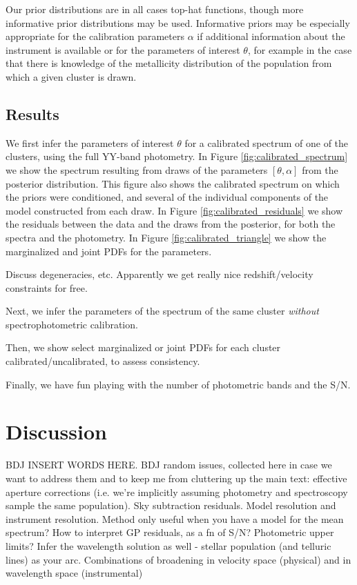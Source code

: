 \documentclass[12pt, letterpaper, preprint]{aastex}
\begin{document}
Our prior distributions are in all cases top-hat functions, though
more informative prior distributions may be used.  Informative priors
may be especially appropriate for the calibration parameters $\alpha$
if additional information about the instrument is available or for the
parameters of interest $\theta$, for example in the case that there
is knowledge of the metallicity distribution of the population from
which a given cluster is drawn.


\subsection{Results}

We first infer the parameters of interest $\theta$ for a calibrated
spectrum of one of the clusters, using the full YY-band photometry. In
Figure \ref{fig:calibrated_spectrum} we show the spectrum resulting
from draws of the parameters $[\theta,\alpha]$ from the posterior
distribution.  This figure also shows the calibrated spectrum on which
the priors were conditioned, and several of the individual components
of the model constructed from each draw.  In Figure
\ref{fig:calibrated_residuals} we show the residuals between the data
and the draws from the posterior, for both the spectra and the
photometry. In Figure \ref{fig:calibrated_triangle} we show the
marginalized and joint PDFs for the parameters.

Discuss degeneracies, etc.  Apparently we get really nice
redshift/velocity constraints for free.

Next, we infer the parameters of the spectrum of the same cluster
\emph{without} spectrophotometric calibration.

Then, we show select marginalized or joint PDFs for each cluster
calibrated/uncalibrated, to assess consistency.

Finally, we have fun playing with the number of photometric bands and the S/N.

\section{Discussion}

BDJ INSERT WORDS HERE.
BDJ random issues, collected here in case we want to address them and
to keep me from cluttering up the main text: effective aperture
corrections (i.e. we're implicitly assuming photometry and
spectroscopy sample the same population).  Sky subtraction residuals.
Model resolution and instrument resolution.  Method only useful when
you have a model for the mean spectrum?  How to interpret GP
residuals, as a fn of S/N?  Photometric upper limits? Infer the
wavelength solution as well - stellar population (and telluric lines)
as your arc. Combinations of broadening in velocity space (physical)
and in wavelength space (instrumental)
\end{document}
